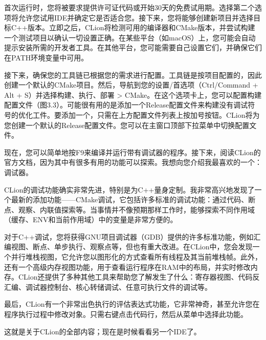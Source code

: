 首次运行时，您将被要求提供许可证代码或开始30天的免费试用期。选择第二个选项将允许您试用IDE并确定它是否适合您。接下来，您将能够创建新项目并选择目标C++版本。立即之后，CLion将检测可用的编译器和CMake版本，并尝试构建一个测试项目以确认一切设置正确。在某些平台（如macOS）上，您可能会自动提示安装所需的开发者工具。在其他平台，您可能需要自己设置它们，并确保它们在PATH环境变量中可用。

接下来，确保您的工具链已根据您的需求进行配置。工具链是按项目配置的，因此创建一个默认的CMake项目。然后，导航到您的设置/首选项（Ctrl/Command + Alt + S）并选择构建、执行、部署 > CMake。在这个选项卡上，您可以配置构建配置文件（图3.3）。可能很有用的是添加一个Release配置文件来构建没有调试符号的优化工件。要添加一个，只需在上方配置文件列表上按加号按钮。CLion将为您创建一个默认的Release配置文件。您可以在主窗口顶部下拉菜单中切换配置文件。

现在，您可以简单地按F9来编译并运行带有调试器的程序。接下来，阅读CLion的官方文档，因为其中有很多有用的功能可以探索。我想向您介绍我最喜欢的一个：调试器。


CLion的调试功能确实非常先进，特别是为C++量身定制。我非常高兴地发现了一个最新的添加功能——CMake调试，它包括许多标准的调试功能：通过代码、断点、观察、内联值探索等。当事情并不像预期那样工作时，能够探索不同作用域（缓存、ENV和当前作用域）中的变量是非常方便的。

对于C++调试，您将获得GNU项目调试器（GDB）提供的许多标准功能，例如汇编视图、断点、单步执行、观察点等，但也有重大改进。在CLion中，您会发现一个并行堆栈视图，它允许您以图形化的方式查看所有线程及其当前堆栈帧。此外，还有一个高级内存视图功能，用于查看运行程序在RAM中的布局，并实时修改内存。CLion还提供了多种其他工具来帮助您了解发生了什么：寄存器视图、代码反汇编、调试器控制台、核心转储调试、任意可执行文件的调试等。

最后，CLion有一个非常出色执行的评估表达式功能，它非常神奇，甚至允许您在程序执行过程中修改对象。只需右键点击代码行，然后从菜单中选择此功能。

这就是关于CLion的全部内容；现在是时候看看另一个IDE了。




























